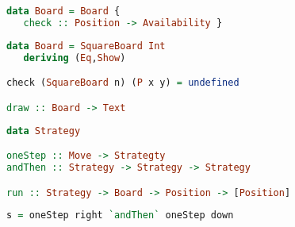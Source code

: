 \documentclass[10pt]{beamer}
\begin{document}
\begin{frame}[fragile]
\begin{lstlisting}[language=haskell, basicstyle=\ttfamily]
data Board = Board { 
   check :: Position -> Availability } 
\end{lstlisting}
\end{frame}
\begin{frame}[fragile]
\begin{lstlisting}[language=haskell, basicstyle=\ttfamily]
data Board = SquareBoard Int
   deriving (Eq,Show) 

check (SquareBoard n) (P x y) = undefined

draw :: Board -> Text
\end{lstlisting}
\end{frame}
\begin{frame}[fragile]
\begin{lstlisting}[language=haskell, basicstyle=\ttfamily]
data Strategy 

oneStep :: Move -> Strategty 
andThen :: Strategy -> Strategy -> Strategy 

run :: Strategy -> Board -> Position -> [Position]
\end{lstlisting}
\end{frame}
\begin{frame}[fragile]
\begin{lstlisting}[language=haskell, basicstyle=\ttfamily]
s = oneStep right `andThen` oneStep down
\end{lstlisting}
\end{frame}
\begin{frame}[fragile]
  \begin{lstlisting}[language=haskell, basicstyle=\ttfamily]
  \end{lstlisting}
\end{frame}
\begin{frame}[fragile]
  \begin{lstlisting}[language=haskell, basicstyle=\ttfamily]
  \end{lstlisting}
\end{frame}
\begin{frame}[fragile]
  \begin{lstlisting}[language=haskell, basicstyle=\ttfamily]
  \end{lstlisting}
\end{frame}
\begin{frame}[fragile]
  \begin{lstlisting}[language=haskell, basicstyle=\ttfamily]
  \end{lstlisting}
\end{frame}
\end{document}
